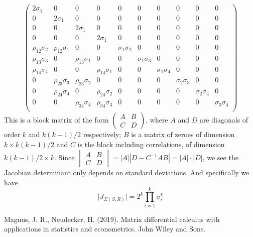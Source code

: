 \documentclass{article}
\begin{document}
$$
\begin{pmatrix}
2 \sigma_1 & 0 & 0 & 0 & 0 & 0 & 0 & 0 & 0 & 0 \\ 
0 & 2 \sigma_1 & 0 & 0 & 0 & 0 & 0 & 0 & 0 & 0 \\ 
0 & 0 & 2 \sigma_1 & 0 & 0 & 0 & 0 & 0 & 0 & 0 \\ 
0 & 0 & 0 & 2 \sigma_1 & 0 & 0 & 0 & 0 & 0 & 0 \\ 
\rho_{12} \sigma_2 & \rho_{12} \sigma_1 & 0 & 0 & \sigma_1 \sigma_2 & 0 & 0 & 0 & 0 & 0 \\
\rho_{13} \sigma_3 & 0 &\rho_{13} \sigma_1  & 0 &  0 & \sigma_1 \sigma_3 & 0 & 0 & 0 & 0 \\
\rho_{14} \sigma_4 & 0 & 0 &  \rho_{14} \sigma_1 & 0 & 0 & \sigma_1 \sigma_4 & 0 & 0 & 0  \\
0 & \rho_{23} \sigma_3 & \rho_{23} \sigma_2 & 0 & 0 & 0 & 0 & \sigma_2 \sigma_3 & 0 & 0 \\
0 & \rho_{24} \sigma_4 & 0 & \rho_{24} \sigma_2 & 0 & 0 & 0 & 0 & \sigma_2 \sigma_4 & 0 \\
0 & 0 & \rho_{34} \sigma_4 & \rho_{34} \sigma_3 & 0 & 0 & 0 & 0 & 0 & \sigma_3 \sigma_4 \\
\end{pmatrix}
$$
This is a block matrix of the form $\begin{pmatrix} A & B \\ C & D\end{pmatrix}$, where $A$ and $D$ are diagonals of order $k$ and $k(k-1)/2$ respectively; $B$ is a matrix of zeroes of dimension $k \times k(k-1)/2$ and $C$ is the block including correlations, of dimension $k(k-1)/2 \times k$. Since $\begin{vmatrix} A & B \\ C & D\end{vmatrix} = |A| |D - C^{-1}AB| = |A| \cdot |D|$,  we see the Jacobian determinant only depends on standard deviations. And specifically we have
\begin{equation}
\mid J_{\Sigma(S,R)}\mid = 2^k \prod_{i=1}^k \sigma_i^k
\end{equation}

 


\begin{thebibliography}{6}
 Magnus, J. R., Neudecker, H. (2019). Matrix differential calculus with applications in statistics and econometrics. John Wiley and Sons.
\end{thebibliography}
\end{document}
